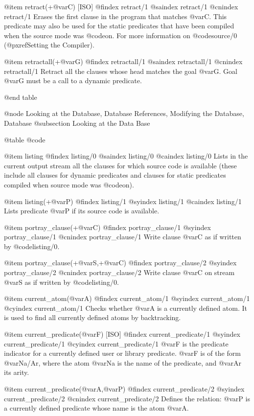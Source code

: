 {{{{{{@item retract(+@var{C}) [ISO]
@findex retract/1
@saindex retract/1
@cnindex retract/1
Erases the first clause in the program that matches @var{C}. This
predicate may also be used for the static predicates that have been
compiled when the source mode was @code{on}. For more information on
@code{source/0} (@pxref{Setting the Compiler}).

@item retractall(+@var{G})
@findex retractall/1
@saindex retractall/1
@cnindex retractall/1
Retract all the clauses whose head matches the goal @var{G}. Goal
@var{G} must be a call to a dynamic predicate.

@end table

@node Looking at the Database, Database References, Modifying the Database, Database
@subsection Looking at the Data Base

@table @code

@item listing
@findex listing/0
@saindex listing/0
@caindex listing/0
Lists in the current output stream all the clauses for which source code
is available (these include all clauses for dynamic predicates and
clauses for static predicates compiled when source mode was @code{on}).

@item listing(+@var{P})
@findex listing/1
@syindex listing/1
@caindex listing/1
Lists predicate @var{P} if its source code is available.

@item portray_clause(+@var{C})
@findex portray_clause/1
@syindex portray_clause/1
@cnindex portray_clause/1
Write clause @var{C} as if written by @code{listing/0}.

@item portray_clause(+@var{S},+@var{C})
@findex portray_clause/2
@syindex portray_clause/2
@cnindex portray_clause/2
Write clause @var{C} on stream @var{S} as if written by @code{listing/0}.

@item current_atom(@var{A})
@findex current_atom/1
@syindex current_atom/1
@cyindex current_atom/1
Checks whether @var{A} is a currently defined atom. It is used to find all
currently defined atoms by backtracking.

@item current_predicate(@var{F}) [ISO]
@findex current_predicate/1
@syindex current_predicate/1
@cyindex current_predicate/1
@var{F} is the predicate indicator for a currently defined user or
library predicate. @var{F} is of the form @var{Na/Ar}, where the atom
@var{Na} is the name of the predicate, and @var{Ar} its arity.

@item current_predicate(@var{A},@var{P})
@findex current_predicate/2
@syindex current_predicate/2
@cnindex current_predicate/2
Defines the relation: @var{P} is a currently defined predicate whose
name is the atom @var{A}.

}}}}}}
